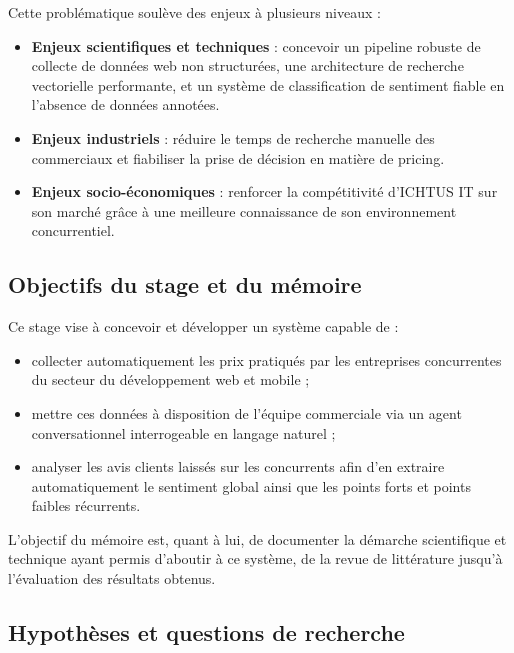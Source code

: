 Cette problématique soulève des enjeux à plusieurs niveaux :
\begin{itemize}
    \item \textbf{Enjeux scientifiques et techniques} : concevoir un pipeline robuste de collecte de données
    web non structurées, une architecture de recherche vectorielle performante, et un système de
    classification de sentiment fiable en l'absence de données annotées.
    \item \textbf{Enjeux industriels} : réduire le temps de recherche manuelle des commerciaux et fiabiliser
    la prise de décision en matière de pricing.
    \item \textbf{Enjeux socio-économiques} : renforcer la compétitivité d'ICHTUS IT sur son marché grâce à
    une meilleure connaissance de son environnement concurrentiel.
\end{itemize}

\subsection{Objectifs du stage et du mémoire}

Ce stage vise à concevoir et développer un système capable de :
\begin{itemize}
    \item collecter automatiquement les prix pratiqués par les entreprises concurrentes du secteur du
    développement web et mobile ;
    \item mettre ces données à disposition de l'équipe commerciale via un agent conversationnel interrogeable
    en langage naturel ;
    \item analyser les avis clients laissés sur les concurrents afin d'en extraire automatiquement le
    sentiment global ainsi que les points forts et points faibles récurrents.
\end{itemize}

L'objectif du mémoire est, quant à lui, de documenter la démarche scientifique et technique ayant permis
d'aboutir à ce système, de la revue de littérature jusqu'à l'évaluation des résultats obtenus.

\subsection{Hypothèses et questions de recherche}

